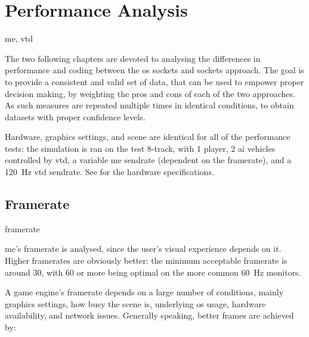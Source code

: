 \chapter{Performance Analysis}\label{ch:performance}

\begin{keywords}
	me, vtd
\end{keywords}

The two following chapters are devoted to analysing the differences in performance and coding between the \gls{os} sockets and  sockets approach. The goal is to provide a consistent and valid set of data, that can be used to empower proper decision making, by weighting the pros and cons of each of the two approaches. As such measures are repeated multiple times in identical conditions, to obtain datasets with proper confidence levels.

Hardware, graphics settings, and scene are identical for all of the performance tests: the simulation is ran on the test 8-track, with \num{1} player, \num{2} \gls{ai} vehicles controlled by \gls{vtd}, a variable \gls{me} \gls{sendrate} (dependent on the \gls{framerate}), and a \SI{120}{\hertz} \gls{vtd} \gls{sendrate}. See  for the hardware specifications.



\section{Framerate}\label{sc:performance:framerate}

\begin{definition}{framerate}
\end{definition}



\gls{me}'s \gls{framerate} is analysed, since the user's visual experience depends on it. Higher \glspl{framerate} are obviously better: the minimum acceptable \gls{framerate} is around \SI{30}{\fps}, with \SI{60}{\fps} or more being optimal on the more common \SI{60}{\hertz} monitors.

A game engine's \gls{framerate} depends on a large number of conditions, mainly graphics settings, how busy the scene is, underlying \gls{os} usage, hardware availability, and network issues. Generally speaking, better frames are achieved by:

